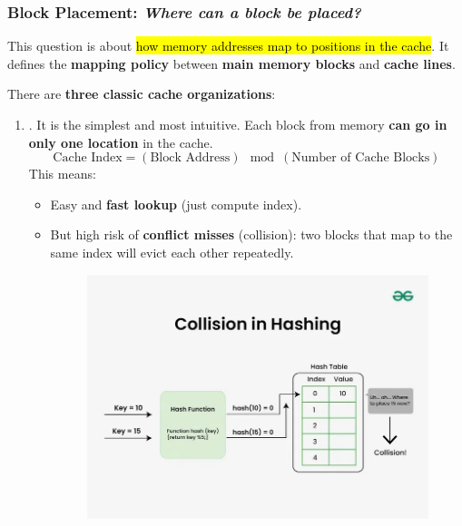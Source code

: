 \subsubsection{Block Placement: \emph{Where can a block be placed?}}\label{subsubsection: Block placement}

This question is about \hl{how memory addresses map to positions in the cache}. It defines the \textbf{mapping policy} between \textbf{main memory blocks} and \textbf{cache lines}.

\highspace
There are \textbf{three classic cache organizations}:
\begin{enumerate}
    \item \label{def: Direct-Mapped Cache} . It is the simplest and most intuitive. Each block from memory \textbf{can go in only one location} in the cache.
    \begin{equation}
        \text{Cache Index} = \left(\text{Block Address}\right) \mod \left(\text{Number of Cache Blocks}\right)
    \end{equation}
    This means:
    \begin{itemize}
        \item[\textcolor{Green3}{\faIcon{check-circle}}] Easy and \textbf{fast lookup} (just compute index).
        \item[\textcolor{Red2}{\faIcon{times-circle}}] But high risk of \textbf{conflict misses} (collision): two blocks that map to the same index will evict each other repeatedly.
        \begin{figure}[!htp]
            \centering
            \includegraphics[width=\textwidth]{img/collision-in-hashing-768.png}

\end{figure}
\end{itemize}
\end{enumerate}
